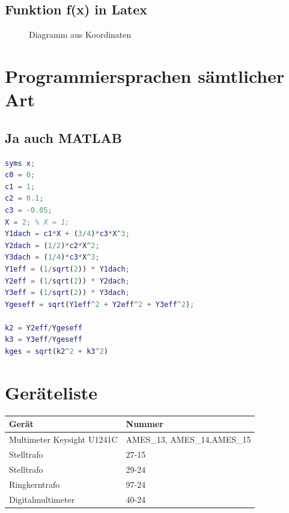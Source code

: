 \documentclass[
12pt,
a4paper,
headings=small,                    %
bibliography=totoc,                %
listof=totoc,                      %
parskip=half*,                     %
]{scrartcl}                        %
\newcommand{\laborsubsection}[2] {
	\renewcommand{\thesubsection}{#1 \thesection.\arabic{subsection}}
	\subsection{{\boldmath #2}}
	\renewcommand{\thesubsection}{\thesection.\arabic{subsection}}
}
\newcommand{\resetlaborsectioncounter}{\setcounter{subsection}{0}}
\begin{document}
\resetlaborsectioncounter
\laborsubsection{D}{Funktion f(x) in Latex}
\begin{figure}[H]
    \centering
    \caption{Diagramm aus Koordinaten}
    \label{fig:2_2_diagramm}
\end{figure}


\newpage
\section{Programmiersprachen sämtlicher Art}
\laborsubsection{D}{Ja auch MATLAB}
\begin{lstlisting}[language=matlab]
syms x;
c0 = 0;
c1 = 1;
c2 = 0.1;
c3 = -0.05;
X = 2; % X = 1;
Y1dach = c1*X + (3/4)*c3*X^3;
Y2dach = (1/2)*c2*X^2;
Y3dach = (1/4)*c3*X^3;
Y1eff = (1/sqrt(2)) * Y1dach;
Y2eff = (1/sqrt(2)) * Y2dach;
Y3eff = (1/sqrt(2)) * Y3dach;
Ygeseff = sqrt(Y1eff^2 + Y2eff^2 + Y3eff^2);

k2 = Y2eff/Ygeseff
k3 = Y3eff/Ygeseff
kges = sqrt(k2^2 + k3^2)

\end{lstlisting}




\newpage
\printbibliography




\newpage
\section*{Geräteliste}
\begin{table} [H]
    \begin{tabular}{|l|l|}
        \hline
        \textbf{Gerät }            & \textbf{Nummer }            \\ \hline
        Multimeter Keysight U1241C & AMES\_13, AMES\_14,AMES\_15 \\ \hline
        Stelltrafo                 & 27-15                       \\ \hline
        Stelltrafo                 & 29-24                       \\ \hline
        Ringkerntrafo              & 97-24                       \\ \hline
        Digitalmultimeter          & 40-24                       \\ \hline
    \end{tabular}
\end{table}
\end{document}
